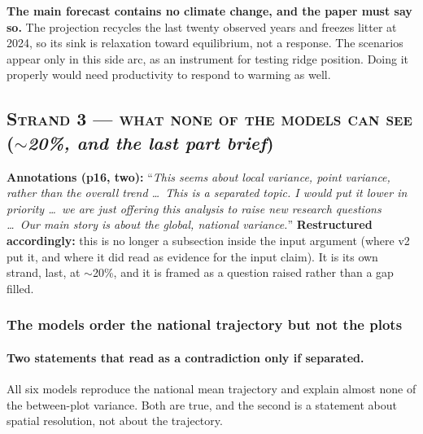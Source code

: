\documentclass[11pt]{article}
\begin{document}
\begin{warn}
\textbf{The main forecast contains no climate change, and the paper must say so.} The projection
recycles the last twenty observed years and freezes litter at 2024, so its sink is relaxation toward
equilibrium, not a response. The scenarios appear only in this side arc, as an instrument for testing
ridge position. Doing it properly would need productivity to respond to warming as well.
\end{warn}

\subsection*{\textsc{Strand 3 --- what none of the models can see} \normalfont(\emph{$\sim$20\%, and the last part brief})}

\begin{ann}
\textbf{Annotations (p16, two):} ``\emph{This seems about local variance, point variance, rather than
the overall trend \dots\ This is a separated topic. I would put it lower in priority \dots\ we are
just offering this analysis to raise new research questions \dots\ Our main story is about the global,
national variance.}'' \textbf{Restructured accordingly:} this is no longer a subsection inside the
input argument (where v2 put it, and where it did read as evidence for the input claim). It is its
own strand, last, at $\sim$20\%, and it is framed as a question raised rather than a gap filled.
\end{ann}

\subsubsection{The models order the national trajectory but not the plots}
\paragraph{Two statements that read as a contradiction only if separated.} All six models reproduce
the national mean trajectory and explain almost none of the between-plot variance. Both are true,
and the second is a statement about spatial resolution, not about the trajectory.
\end{document}
